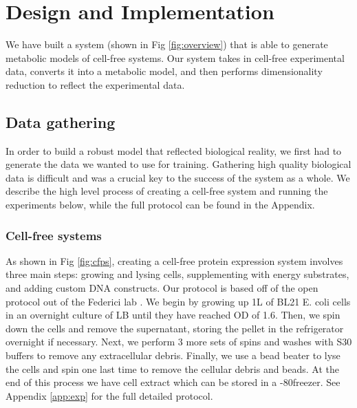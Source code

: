 \chapter{Design and Implementation} \label{chap:impl}

We have built a system (shown in Fig \ref{fig:overview}) that is able to generate metabolic models of cell-free systems.
Our system takes in cell-free experimental data, converts it into a metabolic model, and then performs dimensionality reduction to reflect the experimental data.

\section{Data gathering}
In order to build a robust model that reflected biological reality, we first had to generate the data we wanted to use for training.
Gathering high quality biological data is difficult and was a crucial key to the success of the system as a whole.
We describe the high level process of creating a cell-free system and running the experiments below, while the full protocol can be found in the Appendix.

\subsection{Cell-free systems}
As shown in Fig \ref{fig:cfps}, creating a cell-free protein expression system involves three main steps: growing and lysing cells, supplementing with energy substrates, and adding custom DNA constructs.
Our protocol is based off of the open protocol out of the Federici lab \cite{medina2017cfps}.
We begin by growing up 1L of BL21 E. coli cells in an overnight culture of LB until they have reached OD of 1.6.
Then, we spin down the cells and remove the supernatant, storing the pellet in the refrigerator overnight if necessary.
Next, we perform 3 more sets of spins and washes with S30 buffers to remove any extracellular debris.
Finally, we use a bead beater to lyse the cells and spin one last time to remove the cellular debris and beads.
At the end of this process we have cell extract which can be stored in a -80\degree freezer.
See Appendix \ref{app:exp} for the full detailed protocol.

